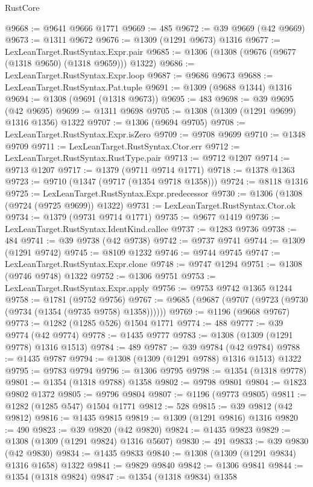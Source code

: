 \begin{lexlean}{RustCore}
\begin{coremodule}
@9668 := @9641 @9666 @1771
@9669 := 485
@9672 := @39 @9669 (@42 @9669)
@9673 := @1311 @9672
@9676 := @1309 (@1291 @9673) @1316
@9677 := LexLeanTarget.RustSyntax.Expr.pair
@9685 := @1306 (@1308 (@9676 (@9677 (@1318 @9650) (@1318 @9659))) @1322)
@9686 := LexLeanTarget.RustSyntax.Expr.loop
@9687 := @9686 @9673
@9688 := LexLeanTarget.RustSyntax.Pat.tuple
@9691 := @1309 (@9688 @1344) @1316
@9694 := @1308 (@9691 (@1318 @9673))
@9695 := 483
@9698 := @39 @9695 (@42 @9695)
@9699 := @1311 @9698
@9705 := @1308 (@1309 (@1291 @9699) @1316 @1356) @1322
@9707 := @1306 (@9694 @9705)
@9708 := LexLeanTarget.RustSyntax.Expr.isZero
@9709 := @9708 @9699
@9710 := @1348 @9709
@9711 := LexLeanTarget.RustSyntax.Ctor.err
@9712 := LexLeanTarget.RustSyntax.RustType.pair
@9713 := @9712 @1207
@9714 := @9713 @1207
@9717 := @1379 (@9711 @9714 @1771)
@9718 := @1378 @1363
@9723 := @9710 (@1347 (@9717 (@1354 @9718 @1358)))
@9724 := @8118 @1316
@9725 := LexLeanTarget.RustSyntax.Expr.predecessor
@9730 := @1306 (@1308 (@9724 (@9725 @9699)) @1322)
@9731 := LexLeanTarget.RustSyntax.Ctor.ok
@9734 := @1379 (@9731 @9714 @1771)
@9735 := @9677 @1419
@9736 := LexLeanTarget.RustSyntax.IdentKind.callee
@9737 := @1283 @9736
@9738 := 484
@9741 := @39 @9738 (@42 @9738)
@9742 := @9737 @9741
@9744 := @1309 (@1291 @9742)
@9745 := @8109 @1232
@9746 := @9744 @9745
@9747 := LexLeanTarget.RustSyntax.Expr.clone
@9748 := @9747 @1294
@9751 := @1308 (@9746 @9748) @1322
@9752 := @1306 @9751
@9753 := LexLeanTarget.RustSyntax.Expr.apply
@9756 := @9753 @9742 @1365 @1244
@9758 := @1781 (@9752 @9756)
@9767 := @9685 (@9687 (@9707 (@9723 (@9730 (@9734 (@1354 (@9735 @9758) @1358))))))
@9769 := @1196 (@9668 @9767)
@9773 := @1282 (@1285 @526) @1504 @1771
@9774 := 488
@9777 := @39 @9774 (@42 @9774)
@9778 := @1435 @9777
@9783 := @1308 (@1309 (@1291 @9778) @1316 @1513)
@9784 := 489
@9787 := @39 @9784 (@42 @9784)
@9788 := @1435 @9787
@9794 := @1308 (@1309 (@1291 @9788) @1316 @1513) @1322
@9795 := @9783 @9794
@9796 := @1306 @9795
@9798 := @1354 (@1318 @9778)
@9801 := @1354 (@1318 @9788) @1358
@9802 := @9798 @9801
@9804 := @1823 @9802 @1372
@9805 := @9796 @9804
@9807 := @1196 (@9773 @9805)
@9811 := @1282 (@1285 @547) @1504 @1771
@9812 := 528
@9815 := @39 @9812 (@42 @9812)
@9816 := @1435 @9815
@9819 := @1309 (@1291 @9816) @1316
@9820 := 490
@9823 := @39 @9820 (@42 @9820)
@9824 := @1435 @9823
@9829 := @1308 (@1309 (@1291 @9824) @1316 @5607)
@9830 := 491
@9833 := @39 @9830 (@42 @9830)
@9834 := @1435 @9833
@9840 := @1308 (@1309 (@1291 @9834) @1316 @1658) @1322
@9841 := @9829 @9840
@9842 := @1306 @9841
@9844 := @1354 (@1318 @9824)
@9847 := @1354 (@1318 @9834) @1358

\end{coremodule}
\end{lexlean}
